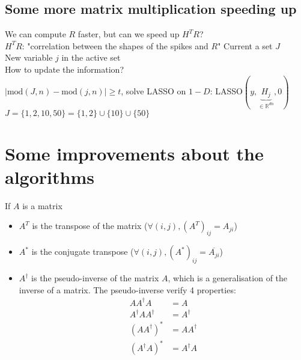 \documentclass{report}
\begin{document}
		\section{Some more matrix multiplication speeding up}
			We can compute $R$ faster, but can we speed up $H^TR$?\\
			$H^TR$: "correlation between the shapes of the spikes and $R$"
			Current a set $J$\\
			New variable $j$ in the active set\\
			How to update the information?\\
			$|\text{mod}(J,n)-\text{mod}(j,n)|\geq t$, solve LASSO on $1-D$: LASSO$(y,\underbrace{H_j}_{\in\mathbb{R}^{dn}},0)$
			$J=\{1,2,10,50\}=\{1,2\}\cup\{10\}\cup\{50\}$

	\chapter{Some improvements about the algorithms}

	\appendices
		If $A$ is a matrix\begin{itemize}
		\item $A^T$ is the transpose of the matrix ($\forall(i,j), \left(A^T\right)_{ij}=A_{ji}$)
		\item $A^*$ is the conjugate transpose ($\forall(i,j), \left(A^*\right)_{ij}=\overline{A_{ji}}$)
		\item $A^\dagger$ is the pseudo-inverse of the matrix $A$, which is a generalisation of the inverse of a matrix. The pseudo-inverse verify 4 properties:\begin{align}
				AA^{\dagger}A				&=A\\
				A^{\dagger}AA^{\dagger}		&=A^{\dagger}\\
				\left(AA^{\dagger}\right)^*	&=AA^{\dagger}\\
				\left(A^{\dagger}A\right)^*	&=A^{\dagger}A
			\end{align}
		\end{itemize}
\end{document}
